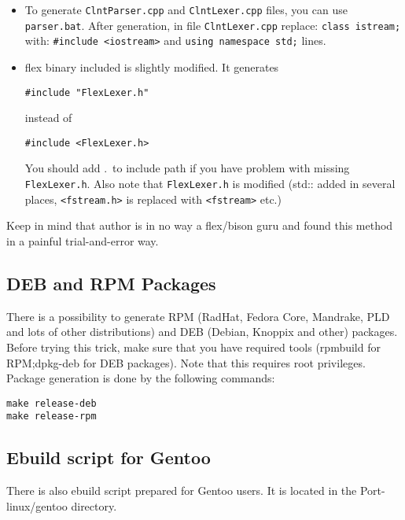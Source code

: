 \begin{itemize}
\item To generate \verb+ClntParser.cpp+ and \verb+ClntLexer.cpp+ files, you can use
\verb+parser.bat+. After generation, in file \verb+ClntLexer.cpp+ replace: \verb+class istream;+
with: \verb+#include <iostream>+ and \verb+using namespace std;+ lines.
\item flex binary included is slightly modified. It generates

\begin{verbatim}
#include "FlexLexer.h"
\end{verbatim} 
instead of 
\begin{verbatim}
#include <FlexLexer.h>
\end{verbatim} 

You should
add .\ to include path if you have problem with missing \verb+FlexLexer.h+.
Also note that \verb+FlexLexer.h+ is modified (std:: added in several places,
\verb+<fstream.h>+ is replaced with \verb+<fstream>+ etc.)
\end{itemize}

Keep in mind that author is in no way a flex/bison guru and found this method
in a painful trial-and-error way. 

\subsection{DEB and RPM Packages}
There is a possibility to generate RPM (RadHat, Fedora Core, Mandrake,
PLD and lots of other distributions) and DEB (Debian, Knoppix and
other) packages. Before trying this trick, make sure that you have
required tools (rpmbuild for RPM;dpkg-deb for DEB
packages). Note that this requires root privileges. 
Package generation is done by the following commands:

\begin{verbatim}
make release-deb
make release-rpm
\end{verbatim}

\subsection{Ebuild script for Gentoo}
There is also ebuild script prepared for Gentoo users. It is located
in the Port-linux/gentoo directory. 

